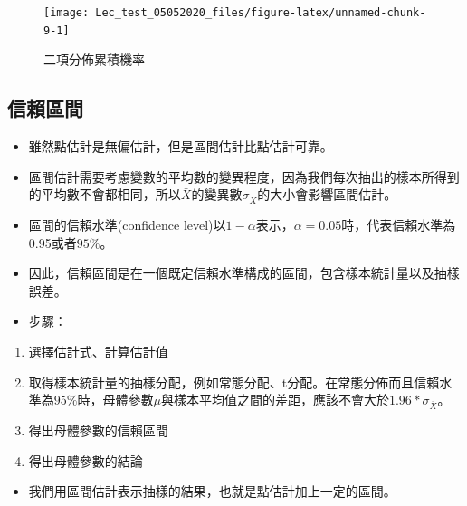 \documentclass[hyperref,]{ctexart}
\providecommand{\tightlist}{%
  \setlength{\itemsep}{0pt}\setlength{\parskip}{0pt}}
\begin{document}
\begin{figure}

\texttt{[image: Lec\_test\_05052020\_files/figure-latex/unnamed-chunk-9-1]} \hfill{}

\caption{\label{fig:pbcum}二項分佈累積機率}\label{fig:unnamed-chunk-9}
\end{figure}

\hypertarget{ux4fe1ux8cf4ux5340ux9593}{%
\subsection{信賴區間}\label{ux4fe1ux8cf4ux5340ux9593}}

\begin{itemize}
\tightlist
\item
  雖然點估計是無偏估計，但是區間估計比點估計可靠。
\item
  區間估計需要考慮變數的平均數的變異程度，因為我們每次抽出的樣本所得到的平均數不會都相同，所以\(\bar{X}\)的變異數\(\sigma_{\bar{X}}\)的大小會影響區間估計。
\item
  區間的信賴水準(confidence
  level)以\(1-\alpha\)表示，\(\alpha=0.05\)時，代表信賴水準為0.95或者\(95\%\)。
\item
  因此，信賴區間是在一個既定信賴水準構成的區間，包含樣本統計量以及抽樣誤差。
\item
  步驟：
\end{itemize}

\begin{enumerate}
\def\labelenumi{\arabic{enumi}.}
\tightlist
\item
  選擇估計式、計算估計值
\item
  取得樣本統計量的抽樣分配，例如常態分配、t分配。在常態分佈而且信賴水準為\(95\%\)時，母體參數\(\mu\)與樣本平均值之間的差距，應該不會大於\(1.96*\sigma_{\bar{X}}\)。
\item
  得出母體參數的信賴區間
\item
  得出母體參數的結論
\end{enumerate}

\begin{itemize}
\tightlist
\item
  我們用區間估計表示抽樣的結果，也就是點估計加上一定的區間。
\end{itemize}
\end{document}
